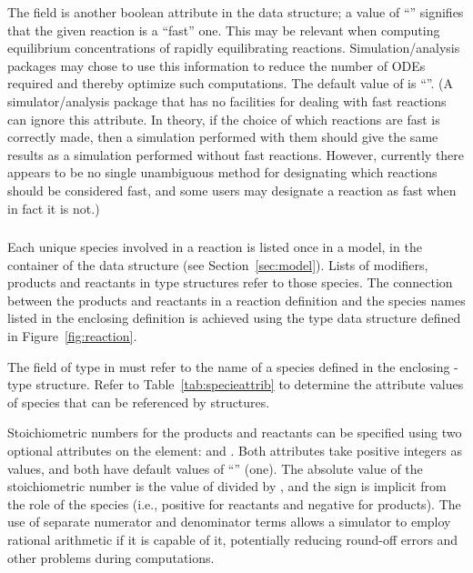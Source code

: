 \documentclass[10pt,twocolumntoc]{cekarticle}
\newcommand{\vref}[1]{\ref{#1}}
\begin{document}
The field  is another boolean attribute in the
 data structure; a value of ``''
signifies that the given reaction is a ``fast'' one.  This may be relevant
when computing equilibrium concentrations of rapidly equilibrating
reactions.  Simulation/analysis packages may chose to use this information
to reduce the number of ODEs required and thereby optimize such
computations.  The default value of  is
``''.  (A simulator/analysis package that has no
facilities for dealing with fast reactions can ignore this attribute. In
theory, if the choice of which reactions are fast is correctly made, then a
simulation performed with them should give the same results as a simulation
performed without fast reactions.  However, currently there appears to be
no single unambiguous method for designating which reactions should be
considered fast, and some users may designate a reaction as fast when in
fact it is not.)

\subsubsection{}
\label{subsec:speciesreference}

Each unique species involved in a reaction is listed once in a model, in
the  container of the  data structure
(see Section~\ref{sec:model}).  Lists of modifiers, products and reactants
in  type structures refer to those species.  The connection
between the products and reactants in a reaction definition and the species
names listed in the enclosing  definition is achieved using
the  type data structure defined in
Figure~\vref{fig:reaction}.

The field  of type  in 
must refer to the name of a species defined in the enclosing
-type structure.  Refer to Table~\ref{tab:specieattrib} to
determine the attribute values of species that can be referenced by
 structures.

Stoichiometric numbers for the products and reactants can be specified
using two optional attributes on the  element:
 and .  Both attributes take
positive integers as values, and both have default values of ``''
(one).  The absolute value of the stoichiometric number is the value of
 divided by , and the sign is
implicit from the role of the species (i.e., positive for reactants and
negative for products).  The use of separate numerator and denominator
terms allows a simulator to employ rational arithmetic if it is capable of
it, potentially reducing round-off errors and other problems during
computations.
\end{document}
